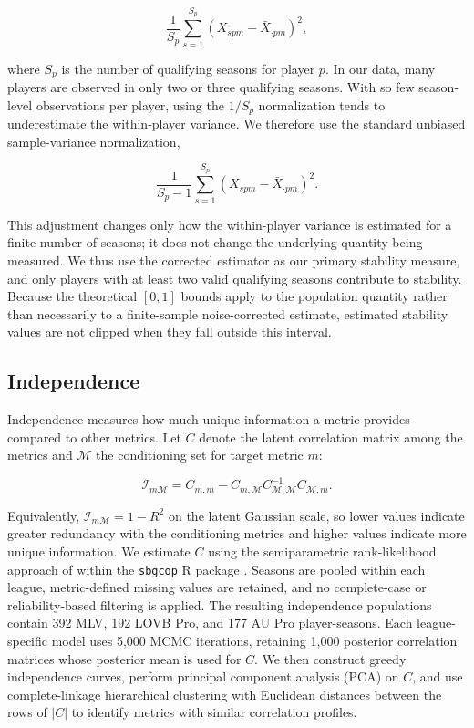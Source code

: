 \documentclass[10pt]{article}
\begin{document}
\[
\frac{1}{S_p}
\sum_{s=1}^{S_p}
\left(X_{spm}-\bar{X}_{\cdot pm}\right)^2,
\]

where $S_p$ is the number of qualifying seasons for player $p$.
In our data, many players are observed in only two or three qualifying seasons. 
With so few season-level observations per player, using the $1/S_p$ normalization tends to underestimate the within-player variance. 
We therefore use the standard unbiased sample-variance normalization,

$$
\frac{1}{S_p-1}
\sum_{s=1}^{S_p}
\left(X_{spm}-\bar{X}_{\cdot pm}\right)^2.
$$

This adjustment changes only how the within-player variance is estimated for a finite number of seasons; it does not change the underlying quantity being measured. 
We thus use the corrected estimator as our primary stability measure, and
only players with at least two valid qualifying seasons contribute to stability.
Because the theoretical $[0,1]$ bounds apply to the population quantity rather than necessarily to a finite-sample noise-corrected estimate, estimated stability values are not clipped when they fall outside this interval.


\subsection{Independence}

Independence measures how much unique information a metric provides compared to other metrics.
Let $C$ denote the latent correlation matrix among the metrics and $\mathcal{M}$ the conditioning set for target metric $m$:

\[
\mathcal{I}_{m\mathcal{M}}
=
C_{m,m}
-
C_{m,\mathcal{M}}
C_{\mathcal{M},\mathcal{M}}^{-1}
C_{\mathcal{M},m}.
\]

Equivalently, $\mathcal{I}_{m\mathcal{M}}=1-R^2$ on the latent Gaussian scale, so lower values indicate greater redundancy with the conditioning metrics and higher values indicate more unique information.
We estimate $C$ using the semiparametric rank-likelihood approach of \citet{hoff_extending_2007} within the \texttt{sbgcop} R package \citep{hoff_sbgcop_2012}.
Seasons are pooled within each league, metric-defined missing values are retained, and no complete-case or reliability-based filtering is applied.
The resulting independence populations contain 392 MLV, 192 LOVB Pro, and 177 AU Pro player-seasons.
Each league-specific model uses 5,000 MCMC iterations, retaining 1,000 posterior correlation matrices whose posterior mean is used for $C$.
We then construct greedy independence curves, perform principal component analysis (PCA) on $C$, and use complete-linkage hierarchical clustering with Euclidean distances between the rows of $|C|$ to identify metrics with similar correlation profiles.
\end{document}
